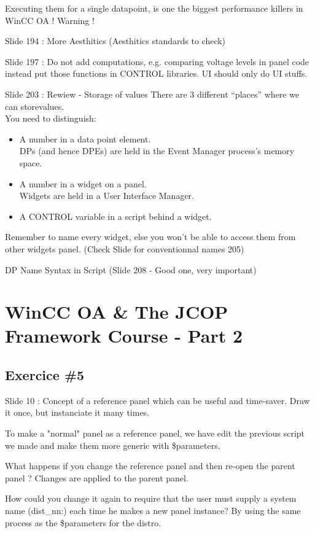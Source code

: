 \documentclass[a4paper, 10pt]{article}
\begin{document}
Executing them for a single datapoint, is one the biggest performance killers in WinCC OA ! Warning !

Slide 194 : More Aesthitics (Aesthitics standards to check)

Slide 197 : Do not add computations, e.g. comparing voltage levels in panel code instead put those functions in CONTROL libraries. UI should only do UI stuffs.

Slide 203 : Rewiew - Storage of values
There are 3 different “places” where we can storevalues.\\
You need to distinguish:
\begin{itemize}
    \item A number in a data point element.\\
DPs (and hence DPEs) are held in the Event Manager process’s memory space.
    \item A number in a widget on a panel.\\
Widgets are held in a User Interface Manager.
    \item A CONTROL variable in a script behind a widget.
\end{itemize}

Remember to name every widget, else you won't be able to access them from other widgets panel.
(Check Slide for conventionnal names 205)

DP Name Syntax in Script (Slide 208 - Good one, very important)

\section{WinCC OA \&  The JCOP Framework Course - Part 2}
\subsection{Exercice \#5}
Slide 10 : Concept of a reference panel which can be useful and time-saver.
Draw it once, but instanciate it many times.

To make a "normal" panel as a reference panel, we have edit the previous script we made and make them more generic with \$parameters.

What happens if you change the reference panel and then re-open the parent panel ?
Changes are applied to the parent panel.

How could you change it again to require that the user must supply a system name (dist\_nn:) each time he makes a new panel instance?
By using the same process as the \$parameters for the distro.
\end{document}
